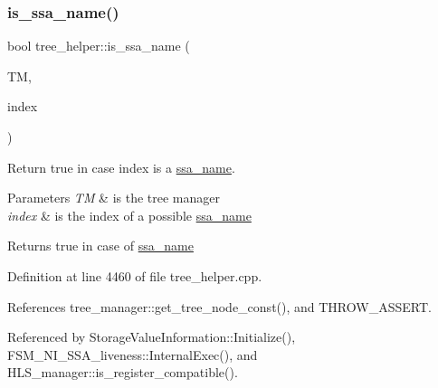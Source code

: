 \subsubsection{\texorpdfstring{is\+\_\+ssa\+\_\+name()}{is\_ssa\_name()}}
{\footnotesize\ttfamily bool tree\+\_\+helper\+::is\+\_\+ssa\+\_\+name (\begin{DoxyParamCaption}\item[{const \hyperlink{tree__manager_8hpp_a792e3f1f892d7d997a8d8a4a12e39346}{tree\+\_\+manager\+Const\+Ref} \&}]{TM,  }\item[{const unsigned int}]{index }\end{DoxyParamCaption})\hspace{0.3cm}{\ttfamily [static]}}



Return true in case index is a \hyperlink{structssa__name}{ssa\+\_\+name}. 


\begin{DoxyParams}{Parameters}
{\em TM} & is the tree manager \\
\hline
{\em index} & is the index of a possible \hyperlink{structssa__name}{ssa\+\_\+name} \\
\hline
\end{DoxyParams}
\begin{DoxyReturn}{Returns}
true in case of \hyperlink{structssa__name}{ssa\+\_\+name} 
\end{DoxyReturn}


Definition at line 4460 of file tree\+\_\+helper.\+cpp.



References tree\+\_\+manager\+::get\+\_\+tree\+\_\+node\+\_\+const(), and T\+H\+R\+O\+W\+\_\+\+A\+S\+S\+E\+RT.



Referenced by Storage\+Value\+Information\+::\+Initialize(), F\+S\+M\+\_\+\+N\+I\+\_\+\+S\+S\+A\+\_\+liveness\+::\+Internal\+Exec(), and H\+L\+S\+\_\+manager\+::is\+\_\+register\+\_\+compatible().


